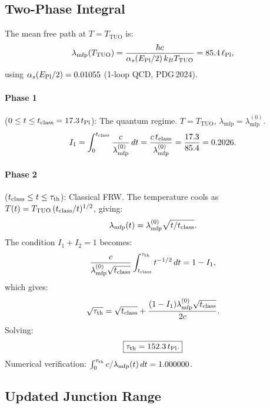 \documentclass[12pt,a4paper]{article}
\theoremstyle{definition}
\newcommand{\tPl}{t_{\mathrm{Pl}}}
\newcommand{\lPl}{\ell_{\mathrm{Pl}}}
\newcommand{\TTUO}{T_{\mathrm{TUO}}}
\newcommand{\Hmfp}{\lambda_{\mathrm{mfp}}}
\newcommand{\alphas}{\alpha_{s}}
\begin{document}
\subsection{Two-Phase Integral}

The mean free path at $T = \TTUO$ is:
\begin{equation}
  \Hmfp(T_{\rm TUO}) = \frac{\hbar c}{\alphas(E_{\rm Pl}/2)\,k_B\TTUO}
  = 85.4\,\lPl,
\end{equation}
using $\alphas(E_{\rm Pl}/2) = 0.01055$ (1-loop QCD, PDG\,2024).

\paragraph{Phase 1} ($0 \leq t \leq t_{\rm class} = 17.3\,\tPl$): The quantum
regime. $T = \TTUO$, $\Hmfp = \Hmfp^{(0)}$.
\begin{equation}
  I_1 = \int_0^{t_{\rm class}} \frac{c}{\Hmfp^{(0)}}\,dt
  = \frac{c\,t_{\rm class}}{\Hmfp^{(0)}}
  = \frac{17.3}{85.4} = 0.2026.
\end{equation}

\paragraph{Phase 2} ($t_{\rm class} \leq t \leq \tau_{\rm th}$): Classical
FRW. The temperature cools as $T(t) = \TTUO\,(t_{\rm class}/t)^{1/2}$,
giving:
\begin{equation}
  \Hmfp(t) = \Hmfp^{(0)}\sqrt{t/t_{\rm class}}.
\end{equation}
The condition $I_1 + I_2 = 1$ becomes:
\begin{equation}
  \frac{c}{\Hmfp^{(0)}\sqrt{t_{\rm class}}}
  \int_{t_{\rm class}}^{\tau_{\rm th}} t^{-1/2}\,dt = 1 - I_1,
\end{equation}
which gives:
\begin{equation}
  \sqrt{\tau_{\rm th}} = \sqrt{t_{\rm class}} + \frac{(1-I_1)\Hmfp^{(0)}\sqrt{t_{\rm class}}}{2c}.
\end{equation}
Solving:
\begin{equation}
  \boxed{\tau_{\rm th} = 152.3\,\tPl.}
\end{equation}
Numerical verification: $\int_0^{\tau_{\rm th}} c/\Hmfp(t)\,dt = 1.000000$.

\subsection{Updated Junction Range}
\end{document}
